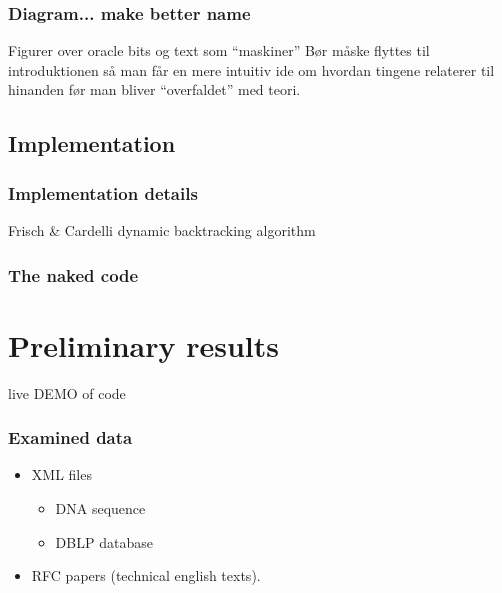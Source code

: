 \documentclass[slidestop,compress,mathserif, xcolor=table]{beamer}
\begin{document}
\begin{frame}
  \frametitle{Diagram... make better name}
  
  Figurer over oracle bits og text som ``maskiner''
  Bør måske flyttes til introduktionen så man får en mere intuitiv ide om
  hvordan tingene relaterer til hinanden før man bliver ``overfaldet'' med teori.
  
\end{frame}


\subsection{Implementation}

\begin{frame}
  \frametitle{Implementation details}
  
  Frisch \& Cardelli dynamic backtracking algorithm

\end{frame}

\begin{frame}
  \frametitle{The naked code}
  
\end{frame}

\section{Preliminary results}

\begin{frame}
  \begin{center}
    \huge{live DEMO of code}
  \end{center}
\end{frame}

\begin{frame}
  \frametitle{Examined data}
  \begin{itemize}
  \item XML files
    
    \begin{itemize}
    \item DNA sequence
      
    \item DBLP database
    \end{itemize}

  \item RFC papers (technical english texts).
    
  \end{itemize}
\end{frame}
\end{document}
